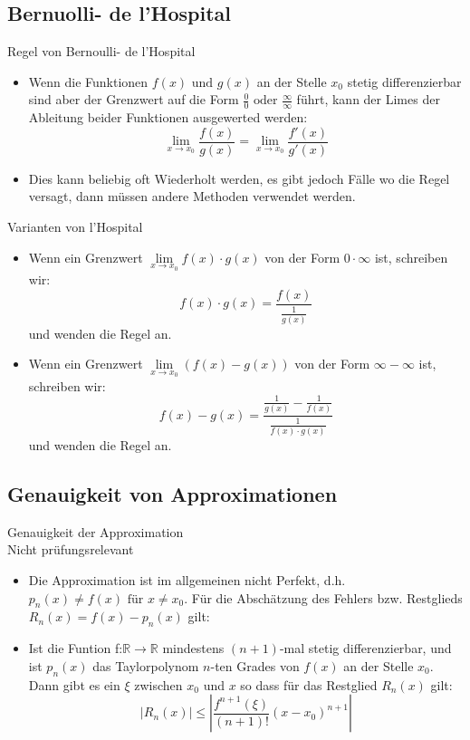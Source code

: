 \subsection{Bernuolli- de l'Hospital}
\begin{definition}{Regel von Bernoulli- de l’Hospital}\\
  \begin{itemize}
    \item Wenn die Funktionen \(f(x)\text{ und }g(x)\) an der Stelle \(x_0\) stetig differenzierbar sind aber der
      Grenzwert auf die Form \(\frac{0}{0}\text{ oder }\frac{\infty}{\infty}\) führt, kann der Limes der Ableitung
      beider Funktionen ausgewerted werden:
      \[\underset{x\rightarrow x_0}\lim\frac{f(x)}{g(x)}=\underset{x\rightarrow x_0}{\lim}\frac{f'(x)}{g'(x)}\]
    \item Dies kann beliebig oft Wiederholt werden, es gibt jedoch Fälle wo die Regel versagt, dann müssen andere
      Methoden verwendet werden.
  \end{itemize}
\end{definition}
\begin{definition}{Varianten von l'Hospital}\\
  \begin{itemize}
    \item Wenn ein Grenzwert \(\underset{x\rightarrow x_0}{\lim}f(x)\cdot g(x)\) von der Form \(0\cdot \infty\) ist,
      schreiben wir:
      \[f(x)\cdot g(x)=\frac{f(x)}{\frac{1}{g(x)}}\]
      und wenden die Regel an.
    \item Wenn ein Grenzwert \(\underset{x\rightarrow x_0}{\lim}(f(x)-g(x))\) von der Form \(\infty - \infty\) ist,
      schreiben wir:
      \[f(x)-g(x)=\frac{\frac{1}{g(x)}-\frac{1}{f(x)}}{\frac{1}{f(x)\cdot g(x)}}\]
      und wenden die Regel an.
  \end{itemize}
\end{definition}
\subsection{Genauigkeit von Approximationen}
\begin{definition}{Genauigkeit der Approximation}\\
  Nicht prüfungsrelevant\\
  \begin{itemize}
    \item Die Approximation ist im allgemeinen nicht Perfekt, d.h. \(p_n(x)\neq f(x)\text{ für }x\neq x_0\). Für die
      Abschätzung des Fehlers bzw. Restglieds \(R_n(x)=f(x)-p_n(x)\) gilt:
    \item Ist die Funtion f:\(\mathbb{R}\rightarrow\mathbb{R}\) mindestens \((n+1)\)-mal stetig differenzierbar, und ist 
    \(p_n(x)\) das Taylorpolynom \(n\)-ten Grades von \(f(x)\) an der Stelle \(x_0\).
    Dann gibt es ein \(\xi\) zwischen \(x_0\) und \(x\) so dass für das Restglied \(R_n(x)\) gilt:
    \[|R_n(x)|\leq \left|\frac{f^{n+1}(\xi)}{(n+1)!}(x-x_0)^{n+1}\right|\]
  \end{itemize}
\end{definition}
